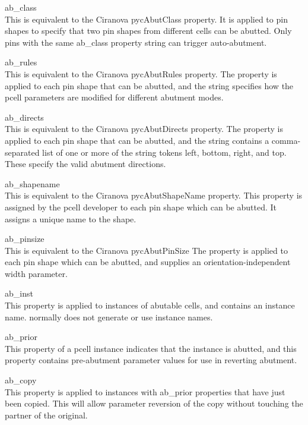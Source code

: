 \begin{description}
\item{\et ab\_class}\\
This is equivalent to the Ciranova {\et pycAbutClass} property.  It is
applied to pin shapes to specify that two pin shapes from different
cells can be abutted.  Only pins with the same {\et ab\_class}
property string can trigger auto-abutment.

\item{\et ab\_rules}\\
This is equivalent to the Ciranova {\et pycAbutRules} property.  The
property is applied to each pin shape that can be abutted, and the
string specifies how the pcell parameters are modified for different
abutment modes.

\item{\et ab\_directs}\\
This is equivalent to the Ciranova {\et pycAbutDirects} property.  The
property is applied to each pin shape that can be abutted, and the
string contains a comma-separated list of one or more of the string
tokens {\vt left}, {\vt bottom}, {\vt right}, and {\vt top}.  These
specify the valid abutment directions.

\item{\et ab\_shapename}\\
This is equivalent to the Ciranova {\et pycAbutShapeName} property. 
This property is assigned by the pcell developer to each pin shape
which can be abutted.  It assigns a unique name to the shape.

\item{\et ab\_pinsize}\\
This is equivalent to the Ciranova {\et pycAbutPinSize} The property
is applied to each pin shape which can be abutted, and supplies an
orientation-independent width parameter.

\item{\et ab\_inst}\\
This property is applied to instances of abutable cells, and contains
an instance name.  {\Xic} normally does not generate or use instance
names.

\item{\et ab\_prior}\\
This property of a pcell instance indicates that the instance is
abutted, and this property contains pre-abutment parameter values for
use in reverting abutment.

\item{\et ab\_copy}\\
This property is applied to instances with {\et ab\_prior} properties
that have just been copied.  This will allow parameter reversion of
the copy without touching the partner of the original.
\end{description}


